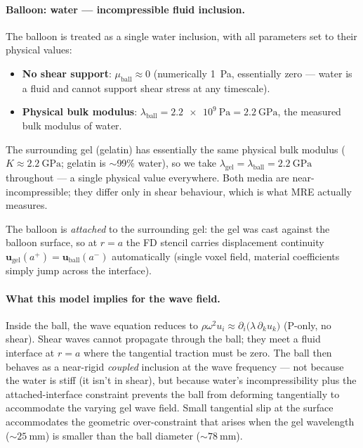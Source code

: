 \documentclass[11pt,letterpaper]{article}
\newcommand{\vect}[1]{\boldsymbol{#1}}
\begin{document}
\paragraph{Balloon: water — incompressible fluid inclusion.}
\label{par:balloon-model}
The balloon is treated as a single water inclusion, with all
parameters set to their physical values:
\begin{itemize}
\item \textbf{No shear support}: $\mu_{\text{ball}} \approx 0$
      (numerically \SI{1}{\pascal}, essentially zero — water is a
      fluid and cannot support shear stress at any timescale).
\item \textbf{Physical bulk modulus}: $\lambda_{\text{ball}} = \SI{2.2e9}{\pascal} =
      \SI{2.2}{\giga\pascal}$, the measured bulk modulus of water.
\end{itemize}

The surrounding gel (gelatin) has essentially the same physical bulk
modulus ($K \approx \SI{2.2}{\giga\pascal}$; gelatin is $\sim$99\% water),
so we take $\lambda_{\text{gel}} = \lambda_{\text{ball}} = \SI{2.2}{\giga\pascal}$
throughout — a single physical value everywhere. Both media are
near-incompressible; they differ only in shear behaviour, which is
what MRE actually measures.

The balloon is \emph{attached} to the surrounding gel: the gel was
cast against the balloon surface, so at $r = a$ the FD stencil
carries displacement continuity $\vect u_{\text{gel}}(a^{+}) =
\vect u_{\text{ball}}(a^{-})$ automatically (single voxel field,
material coefficients simply jump across the interface).

\paragraph{What this model implies for the wave field.}
Inside the ball, the wave equation reduces to
$\rho\omega^{2}u_{i} \approx \partial_{i}\bigl(\lambda\,\partial_{k}u_{k}\bigr)$
(P-only, no shear). Shear waves cannot propagate through the ball;
they meet a fluid interface at $r = a$ where the tangential traction
must be zero. The ball then behaves as a near-rigid \emph{coupled}
inclusion at the wave frequency — not because the water is stiff
(it isn't in shear), but because water's incompressibility plus the
attached-interface constraint prevents the ball from deforming
tangentially to accommodate the varying gel wave field. Small
tangential slip at the surface accommodates the geometric
over-constraint that arises when the gel wavelength (${\sim}\SI{25}{\milli\metre}$)
is smaller than the ball diameter (${\sim}\SI{78}{\milli\metre}$).
\end{document}

